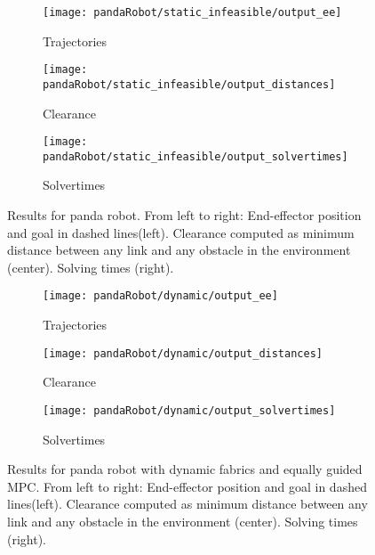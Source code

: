 \begin{figure}
  \begin{subfigure}[]{0.3\textwidth}
  \begin{center}
    \texttt{[image: pandaRobot/static\_infeasible/output\_ee]}
  \end{center}
  \caption{Trajectories}
  \label{fig:pandaRobot_static_infeasible_trajectories}
  \end{subfigure}%
  \begin{subfigure}[]{0.3\textwidth}
  \begin{center}
    \texttt{[image: pandaRobot/static\_infeasible/output\_distances]}
  \end{center}
  \caption{Clearance}
  \label{fig:pandaRobot_static_infeasible_distances}
  \end{subfigure}%
  \begin{subfigure}[]{0.3\textwidth}
  \begin{center}
    \texttt{[image: pandaRobot/static\_infeasible/output\_solvertimes]}
  \end{center}
  \caption{Solvertimes}
  \label{fig:pandaRobot_static_infeasible_solvertimes}
  \end{subfigure}
  \caption{Results for panda robot. From left to right: End-effector position and goal in
dashed lines(left). Clearance computed as minimum distance between any link and any
obstacle in the environment (center). Solving times (right).
}%
  \label{fig:pandaRobot_static_infeasible}
\end{figure}

\begin{figure}
  \begin{subfigure}[]{0.3\textwidth}
  \begin{center}
    \texttt{[image: pandaRobot/dynamic/output\_ee]}
  \end{center}
  \caption{Trajectories}
  \label{fig:pandaRobot_dynamic_trajectories}
  \end{subfigure}%
  \begin{subfigure}[]{0.3\textwidth}
  \begin{center}
    \texttt{[image: pandaRobot/dynamic/output\_distances]}
  \end{center}
  \caption{Clearance}
  \label{fig:pandaRobot_dynamic_distances}
  \end{subfigure}%
  \begin{subfigure}[]{0.3\textwidth}
  \begin{center}
    \texttt{[image: pandaRobot/dynamic/output\_solvertimes]}
  \end{center}
  \caption{Solvertimes}
  \label{fig:pandaRobot_dynamic_solvertimes}
  \end{subfigure}
  \caption{Results for panda robot with dynamic fabrics and equally guided MPC.
From left to right: End-effector position and goal in
dashed lines(left). Clearance computed as minimum distance between any link and any
obstacle in the environment (center). Solving times (right).
}%
  \label{fig:pandaRobot_dynamic}
\end{figure}

